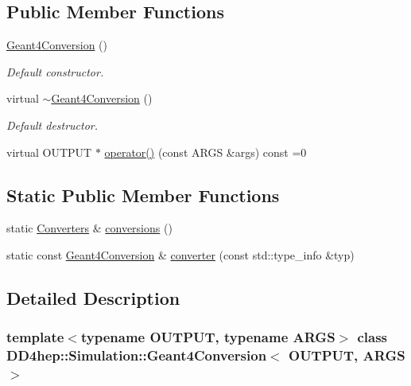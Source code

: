 \subsection*{Public Member Functions}
\begin{DoxyCompactItemize}
\item 
\hyperlink{class_d_d4hep_1_1_simulation_1_1_geant4_conversion_a1c01751a147e2f8f59c5def99d3b610c}{Geant4Conversion} ()
\begin{DoxyCompactList}\small\item\em Default constructor. \item\end{DoxyCompactList}\item 
virtual \hyperlink{class_d_d4hep_1_1_simulation_1_1_geant4_conversion_ad45a38e4466edfe39670a783931bdbe6}{$\sim$Geant4Conversion} ()
\begin{DoxyCompactList}\small\item\em Default destructor. \item\end{DoxyCompactList}\item 
virtual OUTPUT $\ast$ \hyperlink{class_d_d4hep_1_1_simulation_1_1_geant4_conversion_afab79d045509dd073e3c5d435ff84dc2}{operator()} (const ARGS \&args) const =0
\end{DoxyCompactItemize}
\subsection*{Static Public Member Functions}
\begin{DoxyCompactItemize}
\item 
static \hyperlink{class_d_d4hep_1_1_simulation_1_1_geant4_conversion_a1e6c074730135cc207cbd8d8030a189f}{Converters} \& \hyperlink{class_d_d4hep_1_1_simulation_1_1_geant4_conversion_ab9cbccbc85006e7c05a09e89b9b7a93f}{conversions} ()
\item 
static const \hyperlink{class_d_d4hep_1_1_simulation_1_1_geant4_conversion}{Geant4Conversion} \& \hyperlink{class_d_d4hep_1_1_simulation_1_1_geant4_conversion_ae3cf2cfa3d9381220a8865943a496ff5}{converter} (const std::type\_\-info \&typ)
\end{DoxyCompactItemize}


\subsection{Detailed Description}
\subsubsection*{template$<$typename OUTPUT, typename ARGS$>$ class DD4hep::Simulation::Geant4Conversion$<$ OUTPUT, ARGS $>$}

